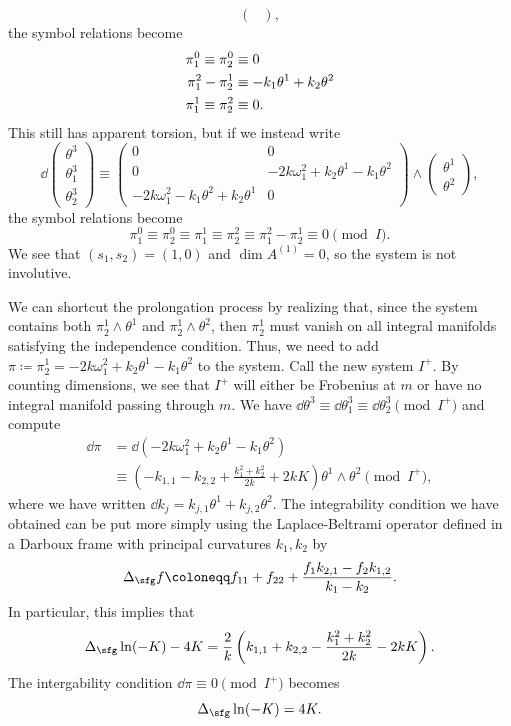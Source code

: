 \begin{example}
\[\begin{pmatrix}
    \end{pmatrix},
    \]
    the symbol relations become 
    \begin{align}
        \pi^0_1\equiv \pi^0_2&\equiv 0 \notag\\
        \pi^2_1-\pi^1_2&\equiv -k_1\theta^1+k_2\theta^2\notag\\
        \pi^1_1\equiv \pi^2_2&\equiv 0.
    \end{align}
    This still has apparent torsion, but if we instead write 
    \[\dd\begin{pmatrix}
        \theta^3\\\theta^3_1\\\theta^3_2
    \end{pmatrix}\equiv 
    \begin{pmatrix}
        0 & 0\\
        0 & -2k\omega^2_1+k_2\theta^1-k_1\theta^2\\
        -2k\omega^2_1-k_1\theta^2+k_2\theta^1 & 0
    \end{pmatrix}
    \wedge \begin{pmatrix}
        \theta^1\\\theta^2
    \end{pmatrix},
    \]
    the symbol relations become 
    \[\pi^0_1\equiv \pi^0_2\equiv\pi^1_1\equiv\pi^2_2\equiv \pi^2_1-\pi^1_2\equiv 0\pmod{I}.\]
    We see that $(s_1,s_2)=(1,0)$ and $\dim A^{(1)}=0$, so the system is not involutive.

    We can shortcut the prolongation process by realizing that, since the system contains both $\pi^1_2\wedge\theta^1$ and $\pi^1_2\wedge\theta^2$, then $\pi^1_2$ must vanish on all integral manifolds satisfying the independence condition. Thus, we need to add $\pi\coloneqq \pi^1_2=-2k\omega^2_1+k_2\theta^1-k_1\theta^2$ to the system. Call the new system $I^+$. By counting dimensions, we see that $I^+$ will either be Frobenius at $m$ or have no integral manifold passing through $m$. We have $\dd\theta^3\equiv \dd\theta^3_1\equiv \dd\theta^3_2\pmod{I^+}$ and compute 
    \begin{align}
        \dd\pi&=\dd(-2k\omega^2_1+k_2\theta^1-k_1\theta^2)\\
        &\equiv \left(-k_{1,1}-k_{2,2}+\frac{k_1^2+k_2^2}{2k}+2kK\right)\theta^1\wedge\theta^2 \pmod{I^+},
    \end{align}
    where we have written $\dd k_j=k_{j,1}\theta^1+k_{j,2}\theta^2$. The integrability condition we have obtained can be put more simply using the Laplace-Beltrami operator defined in a Darboux frame with principal curvatures $k_1,k_2$ by
    \[\Delta_{\sfg} f \coloneqq f_{11}+f_{22}+\frac{f_1k_{2,1}-f_2k_{1,2}}{k_1-k_2}.\]
    In particular, this implies that
    \[\Delta_{\sfg} \ln(-K)-4K=\frac{2}{k}\left(k_{1,1}+k_{2,2}-\frac{k_1^2+k_2^2}{2k}-2kK\right).\]
    The intergability condition $\dd\pi\equiv 0\pmod{I^+}$ becomes
    \[\Delta_{\sfg}\ln(-K)=4K.\]
\end{example}


